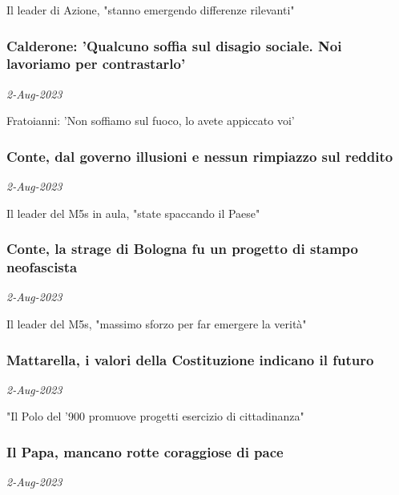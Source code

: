 Il leader di Azione, "stanno emergendo differenze rilevanti"
\subsubsection{Calderone: 'Qualcuno soffia sul disagio sociale. Noi lavoriamo per contrastarlo' \href{https://www.ansa.it/sito/notizie/politica/2023/08/02/calderone-qualcuno-soffia-sul-disagio-sociale.-noi-lavoriamo-per-contrastarlo_f04c6847-a6f8-459c-be17-b10b96c17f21.html}{}}
\textit{2-Aug-2023}

Fratoianni: 'Non soffiamo sul fuoco, lo avete appiccato voi'
\subsubsection{Conte, dal governo illusioni e nessun rimpiazzo sul reddito \href{https://www.ansa.it/sito/notizie/politica/2023/08/02/conte-dal-governo-illusioni-e-nessun-rimpiazzo-sul-reddito_d08f8255-d6f6-46fd-ab41-54dfadf31fd2.html}{}}
\textit{2-Aug-2023}

Il leader del M5s in aula, "state spaccando il Paese"
\subsubsection{Conte, la strage di Bologna fu un progetto di stampo neofascista \href{https://www.ansa.it/sito/notizie/politica/2023/08/02/conte-la-strage-di-bologna-fu-un-progetto-di-stampo-neofascista_de689bd0-1857-4a35-92f6-76035de26f75.html}{}}
\textit{2-Aug-2023}

Il leader del M5s, "massimo sforzo per far emergere la verit\`{a}"
\subsubsection{Mattarella, i valori della Costituzione indicano il futuro \href{https://www.ansa.it/sito/notizie/politica/2023/08/02/mattarella-i-valori-della-costituzione-indicano-il-futuro_6b5e0515-ffe2-4dcb-9f82-5c3eddd9e2ed.html}{}}
\textit{2-Aug-2023}

"Il Polo del '900 promuove progetti esercizio di cittadinanza"
\subsubsection{Il Papa, mancano rotte coraggiose di pace \href{https://www.ansa.it/sito/notizie/politica/2023/08/02/il-papa-mancano-rotte-coraggiose-di-pace_24b32037-b989-497f-8e31-32b33e933bb2.html}{}}
\textit{2-Aug-2023}

